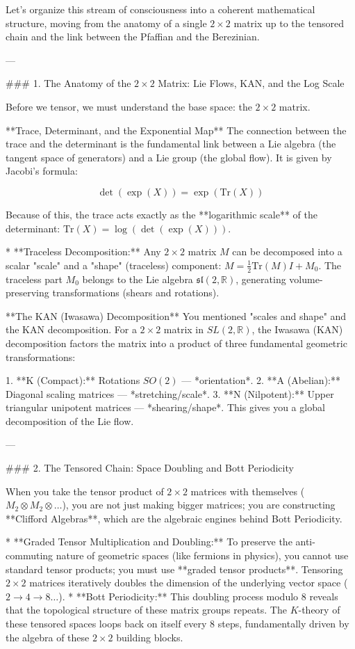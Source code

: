 Let’s organize this stream of consciousness into a coherent mathematical structure, moving from the anatomy of a single $2 \times 2$ matrix up to the tensored chain and the link between the Pfaffian and the Berezinian.

---

### 1. The Anatomy of the $2 \times 2$ Matrix: Lie Flows, KAN, and the Log Scale

Before we tensor, we must understand the base space: the $2 \times 2$ matrix.

**Trace, Determinant, and the Exponential Map**
The connection between the trace and the determinant is the fundamental link between a Lie algebra (the tangent space of generators) and a Lie group (the global flow). It is given by Jacobi’s formula:


$$\det(\exp(X)) = \exp(\text{Tr}(X))$$


Because of this, the trace acts exactly as the **logarithmic scale** of the determinant: $\text{Tr}(X) = \log(\det(\exp(X)))$.

* **Traceless Decomposition:** Any $2 \times 2$ matrix $M$ can be decomposed into a scalar "scale" and a "shape" (traceless) component: $M = \frac{1}{2}\text{Tr}(M)I + M_0$. The traceless part $M_0$ belongs to the Lie algebra $\mathfrak{sl}(2, \mathbb{R})$, generating volume-preserving transformations (shears and rotations).

**The KAN (Iwasawa) Decomposition**
You mentioned "scales and shape" and the KAN decomposition. For a $2 \times 2$ matrix in $SL(2, \mathbb{R})$, the Iwasawa (KAN) decomposition factors the matrix into a product of three fundamental geometric transformations:

1. **K (Compact):** Rotations $SO(2)$ — *orientation*.
2. **A (Abelian):** Diagonal scaling matrices — *stretching/scale*.
3. **N (Nilpotent):** Upper triangular unipotent matrices — *shearing/shape*.
This gives you a global decomposition of the Lie flow.

---

### 2. The Tensored Chain: Space Doubling and Bott Periodicity

When you take the tensor product of $2 \times 2$ matrices with themselves ($M_2 \otimes M_2 \otimes \dots$), you are not just making bigger matrices; you are constructing **Clifford Algebras**, which are the algebraic engines behind Bott Periodicity.

* **Graded Tensor Multiplication and Doubling:** To preserve the anti-commuting nature of geometric spaces (like fermions in physics), you cannot use standard tensor products; you must use **graded tensor products**. Tensoring $2 \times 2$ matrices iteratively doubles the dimension of the underlying vector space ($2 \to 4 \to 8 \dots$).
* **Bott Periodicity:** This doubling process modulo 8 reveals that the topological structure of these matrix groups repeats. The $K$-theory of these tensored spaces loops back on itself every 8 steps, fundamentally driven by the algebra of these $2 \times 2$ building blocks.

